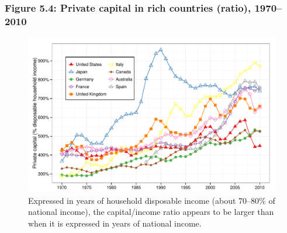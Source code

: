 \documentclass[t]{beamer}\usepackage[]{graphicx}\usepackage[]{color}
\newenvironment{knitrout}{}{} %
\begin{document}
\begin{frame}[label=Figure_5_4]
\frametitle{Figure 5.4: Private capital in rich countries (ratio), 1970--2010}
\begin{figure}[t]
\begin{minipage}[b]{\textwidth}
\centering
\begin{knitrout}\footnotesize
{}\color{fgcolor}

{\centering \includegraphics[width=1\linewidth]{figures/color/Figure_5_4} 

}



\end{knitrout}
\caption{Expressed in years of household disposable income (about 70--80\% of national income), the capital/income ratio appears to be larger than when it is expressed in years of national income.}
\end{minipage}
\end{figure}
\end{frame}
\end{document}
